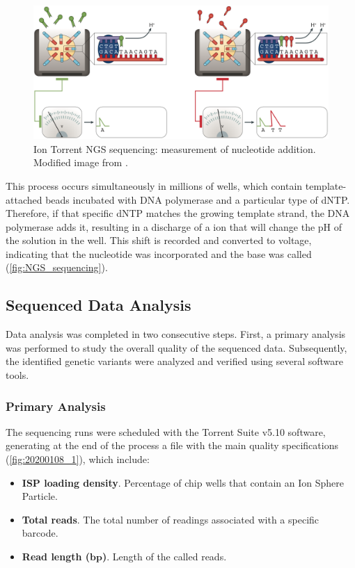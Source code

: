 \begin{figure}[ht]
    \centering
    \includegraphics[width=\textwidth]{Images/chapter_3/NGS_sequencing.png}
    \caption{Ion Torrent\texttrademark{} NGS sequencing: measurement of nucleotide addition. Modified image from \cite{NGS}.}
    \label{fig:NGS_sequencing}
\end{figure}

This process occurs simultaneously in millions of wells, which contain template-attached beads incubated with DNA polymerase and a particular type of dNTP. Therefore, if that specific dNTP matches the growing template strand, the DNA polymerase adds it, resulting in a discharge of a  ion that will change the pH of the solution in the well. This shift is recorded and converted to voltage, indicating that the nucleotide was incorporated and the base was called (\autoref{fig:NGS_sequencing}).

\subsection{Sequenced Data Analysis}

Data analysis was completed in two consecutive steps. First, a primary analysis was performed to study the overall quality of the sequenced data. Subsequently, the identified genetic variants were analyzed and verified using several software tools.

\subsubsection{Primary Analysis}

The sequencing runs were scheduled with the Torrent Suite\texttrademark{} v5.10 software, generating at the end of the process a file with the main quality specifications (\autoref{fig:20200108_1}), which include:
\begin{itemize}
    \item \textbf{ISP loading density}. Percentage of chip wells that contain an Ion Sphere\texttrademark{} Particle.
    \item \textbf{Total reads}. The total number of readings associated with a specific barcode.
    \item \textbf{Read length ($\boldsymbol{bp}$)}. Length of the called reads.
\end{itemize}

